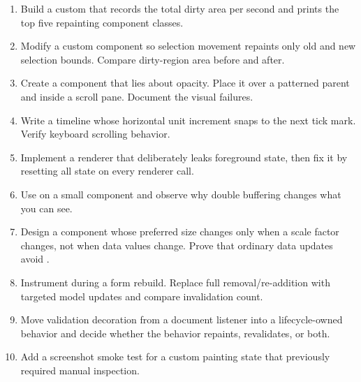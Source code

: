 \begin{exercisebox}
\begin{enumerate}
\item Build a custom  that records the total dirty area per second and prints the top five repainting component classes.
\item Modify a custom component so selection movement repaints only old and new selection bounds. Compare dirty-region area before and after.
\item Create a component that lies about opacity. Place it over a patterned parent and inside a scroll pane. Document the visual failures.
\item Write a  timeline whose horizontal unit increment snaps to the next tick mark. Verify keyboard scrolling behavior.
\item Implement a renderer that deliberately leaks foreground state, then fix it by resetting all state on every renderer call.
\item Use  on a small component and observe why double buffering changes what you can see.
\item Design a component whose preferred size changes only when a scale factor changes, not when data values change. Prove that ordinary data updates avoid .
\item Instrument  during a form rebuild. Replace full removal/re-addition with targeted model updates and compare invalidation count.
\item Move validation decoration from a document listener into a lifecycle-owned behavior and decide whether the behavior repaints, revalidates, or both.
\item Add a screenshot smoke test for a custom painting state that previously required manual inspection.
\end{enumerate}
\end{exercisebox}

